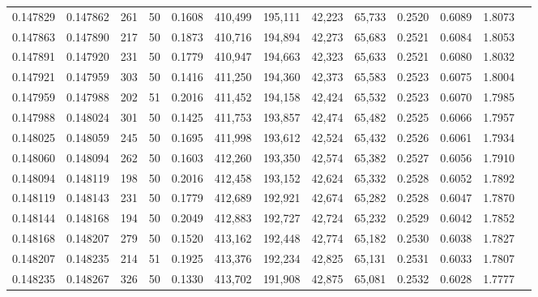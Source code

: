 \begin{tabular}{rrrrrrrrrrrrr}
0.147829 & 0.147862 &   261 &  50 &                                     0.1608 & 410,499 & 195,111 &  42,223 &  65,733 & 0.2520 & 0.6089 & 1.8073 \\
0.147863 & 0.147890 &   217 &  50 &                                     0.1873 & 410,716 & 194,894 &  42,273 &  65,683 & 0.2521 & 0.6084 & 1.8053 \\
0.147891 & 0.147920 &   231 &  50 &                                     0.1779 & 410,947 & 194,663 &  42,323 &  65,633 & 0.2521 & 0.6080 & 1.8032 \\
0.147921 & 0.147959 &   303 &  50 &                                     0.1416 & 411,250 & 194,360 &  42,373 &  65,583 & 0.2523 & 0.6075 & 1.8004 \\
0.147959 & 0.147988 &   202 &  51 &                                     0.2016 & 411,452 & 194,158 &  42,424 &  65,532 & 0.2523 & 0.6070 & 1.7985 \\
0.147988 & 0.148024 &   301 &  50 &                                     0.1425 & 411,753 & 193,857 &  42,474 &  65,482 & 0.2525 & 0.6066 & 1.7957 \\
0.148025 & 0.148059 &   245 &  50 &                                     0.1695 & 411,998 & 193,612 &  42,524 &  65,432 & 0.2526 & 0.6061 & 1.7934 \\
0.148060 & 0.148094 &   262 &  50 &                                     0.1603 & 412,260 & 193,350 &  42,574 &  65,382 & 0.2527 & 0.6056 & 1.7910 \\
0.148094 & 0.148119 &   198 &  50 &                                     0.2016 & 412,458 & 193,152 &  42,624 &  65,332 & 0.2528 & 0.6052 & 1.7892 \\
0.148119 & 0.148143 &   231 &  50 &                                     0.1779 & 412,689 & 192,921 &  42,674 &  65,282 & 0.2528 & 0.6047 & 1.7870 \\
0.148144 & 0.148168 &   194 &  50 &                                     0.2049 & 412,883 & 192,727 &  42,724 &  65,232 & 0.2529 & 0.6042 & 1.7852 \\
0.148168 & 0.148207 &   279 &  50 &                                     0.1520 & 413,162 & 192,448 &  42,774 &  65,182 & 0.2530 & 0.6038 & 1.7827 \\
0.148207 & 0.148235 &   214 &  51 &                                     0.1925 & 413,376 & 192,234 &  42,825 &  65,131 & 0.2531 & 0.6033 & 1.7807 \\
0.148235 & 0.148267 &   326 &  50 &                                     0.1330 & 413,702 & 191,908 &  42,875 &  65,081 & 0.2532 & 0.6028 & 1.7777 \\

\end{tabular}
